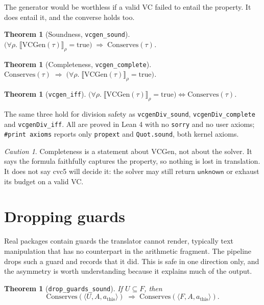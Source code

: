 \documentclass[11pt,a4paper]{article}
\newcommand{\seme}[2]{\llbracket #1 \rrbracket_{#2}}
\newcommand{\VC}{\mathrm{VCGen}}
\newcommand{\Conserves}{\mathrm{Conserves}}
\newcommand{\unknown}{\mathsf{unknown}}
\newcommand{\code}[1]{\texttt{#1}}
\theoremstyle{definition}
\theoremstyle{plain}
\newtheorem{theorem}[definition]{Theorem}
\theoremstyle{remark}
\newtheorem*{warning}{Caution}
\begin{document}
The generator would be worthless if a valid VC failed to entail the property.
It does entail it, and the converse holds too.

\begin{theorem}[Soundness, \code{vcgen\_sound}]
\label{thm:sound}
$\bigl(\forall \rho.\; \seme{\VC(\tau)}{\rho} = \text{true}\bigr) \;\Longrightarrow\; \Conserves(\tau)$.
\end{theorem}

\begin{theorem}[Completeness, \code{vcgen\_complete}]
$\Conserves(\tau) \;\Longrightarrow\; \bigl(\forall \rho.\; \seme{\VC(\tau)}{\rho} = \text{true}\bigr)$.
\end{theorem}

\begin{theorem}[\code{vcgen\_iff}]
$\bigl(\forall \rho.\; \seme{\VC(\tau)}{\rho} = \text{true}\bigr) \iff \Conserves(\tau)$.
\end{theorem}

\noindent
The same three hold for division safety as \code{vcgenDiv\_sound},
\code{vcgenDiv\_complete} and \code{vcgenDiv\_iff}. All are proved in Lean 4
with no \code{sorry} and no user axioms; \code{\#print axioms} reports only
\code{propext} and \code{Quot.sound}, both kernel axioms.

\begin{warning}
Completeness is a statement about $\VC$, not about the solver. It says the
formula faithfully captures the property, so nothing is lost in translation. It
does not say cvc5 will decide it: the solver may still return $\unknown$ or
exhaust its budget on a valid VC.
\end{warning}

\section{Dropping guards}
\label{sec:drop}

Real packages contain guards the translator cannot render, typically text
manipulation that has no counterpart in the arithmetic fragment. The pipeline
drops such a guard and records that it did. This is safe in one direction only,
and the asymmetry is worth understanding because it explains much of the
output.

\begin{theorem}[\code{drop\_guards\_sound}]
If $U \subseteq F$, then
\[
  \Conserves(\langle U, A, a_{\text{this}}\rangle)
  \;\Longrightarrow\;
  \Conserves(\langle F, A, a_{\text{this}}\rangle).
\]
\end{theorem}
\end{document}
